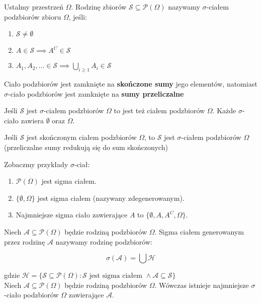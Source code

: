 \documentclass{article}
\newenvironment{definition}[1]{%
    \trivlist
    \item[\hskip\labelsep\textbf{Definition. #1.}]
    \ignorespaces
}{%
    \endtrivlist
}
\newenvironment{fact}[1]{%
    \trivlist
    \item[\hskip\labelsep\textbf{Fact. #1.}]
    \ignorespaces
}{%
    \endtrivlist
}
\newenvironment{information}[1]{%
    \trivlist
    \item[\hskip\labelsep\textbf{Information. #1.}]
    \ignorespaces
}{%
    \endtrivlist
}
\begin{document}
\begin{definition}{$\sigma$-ciało podzbiorów}
Ustalmy przestrzeń $\Omega$. Rodzinę zbiorów $\mathcal{S} \subseteq \mathcal{P}(\Omega)$ nazywamy $\sigma$-ciałem podzbiorów zbioru $\Omega$, jeśli:
\begin{enumerate}
    \item \( \mathcal{S} \neq \emptyset \)
    \item \( A\in \mathcal{S} \implies A^{C} \in \mathcal{S} \)
    \item \( A_1, A_2, \dots \in \mathcal{S} \implies \bigcup_{i\geq 1} A_{i} \in \mathcal{S} \)
\end{enumerate} 

\noindent
Ciało podzbiorów jest zamknięte na \textbf{skończone sumy} jego elementów, natomiast
$\sigma$-ciało podzbiorów jest zamknięte na \textbf{sumy przeliczalne}
\end{definition}

\begin{fact}{Ciało z sigma ciała}
    Jeśli $\mathcal{S}$ jest $\sigma$-ciałem podzbiorów $\Omega$ to jest też ciałem podzbiorów $\Omega$.
    Każde $\sigma$-ciało zawiera $\emptyset$ oraz $\Omega$.
\end{fact}

\begin{fact}{Skończone ciało podzbiorów $\Omega$}
    Jeśli $\mathcal{S}$ jest skończonym ciałem podzbiorów $\Omega$, to $\mathcal{S}$ jest $\sigma$-ciałem podzbiorów $\Omega$ (przeliczalne sumy redukują się do sum skończonych)
\end{fact}

\begin{information}{Przykład Sigma Ciał}
    Zobaczmy przykłady $\sigma$-ciał:
    \begin{enumerate}
        \item $\mathcal{P}(\Omega)$ jest sigma ciałem.
        \item $\{\emptyset, \Omega\}$ jest sigma ciałem (nazywany zdegenerowanym).
        \item Najmniejsze sigma ciało zawierające $A$ to $\{\emptyset, A, A^C, \Omega\}$.
    \end{enumerate}
\end{information}

\begin{definition}{Sigma ciało generowane}
    Niech $\mathcal{A} \subseteq \mathcal{P}(\Omega)$ będzie rodziną podzbiorów $\Omega$. Sigma ciałem generowanym przez rodzinę $\mathcal{A}$ nazywamy rodzinę podzbiorów:

    \[
    \sigma(\mathcal{A}) = \bigcup \mathcal{H}
    \]

    \noindent
    gdzie $\mathcal{H} = \{ \mathcal{S} \subseteq \mathcal{P}(\Omega) : \mathcal{S} \text{ jest sigma ciałem } \land \mathcal{A} \subseteq \mathcal{S} \}$\\

    \noindent
    Niech $\mathcal{A} \subseteq \mathcal{P}(\Omega)$ będzie rodziną podzbiorów $\Omega$. 
    Wówczas istnieje najmniejsze $\sigma$-ciało podzbiorów $\Omega$ zawierające $\mathcal{A}$. 
\end{definition}
\end{document}
